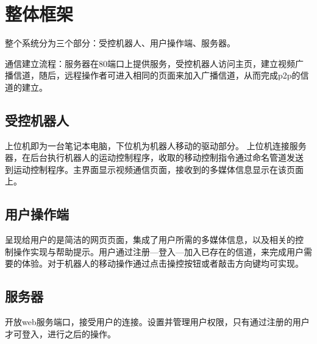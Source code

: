 \chapter{整体框架}

整个系统分为三个部分：受控机器人、用户操作端、服务器。

通信建立流程：服务器在80端口上提供服务，受控机器人访问主页，建立视频广
播信道，随后，远程操作者可进入相同的页面来加入广播信道，从而完成p2p的信
道的建立。

\section{受控机器人}

上位机即为一台笔记本电脑，下位机为机器人移动的驱动部分。
上位机连接服务
器，在后台执行机器人的运动控制程序，收取的移动控制指令通过命名管道发送
到运动控制程序。主界面显示视频通信页面，接收到的多媒体信息显示在该页面
上。

\section{用户操作端}

呈现给用户的是简洁的网页页面，集成了用户所需的多媒体信息，以及相关的控
制操作实现与帮助提示。用户通过注册—登入—加入已存在的信道，来完成用户需
要的体验。对于机器人的移动操作通过点击操控按钮或者敲击方向键均可实现。

\section{服务器}

开放web服务端口，接受用户的连接。设置并管理用户权限，只有通过注册的用户
才可登入，进行之后的操作。
